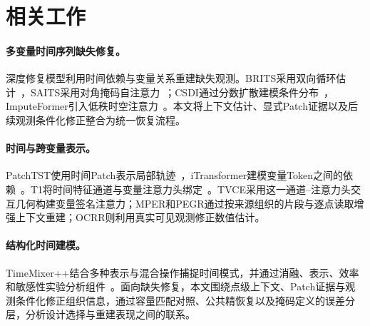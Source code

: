 \section{相关工作}\label{sec:related}
\paragraph{多变量时间序列缺失修复。}
深度修复模型利用时间依赖与变量关系重建缺失观测。BRITS采用双向循环估计~\cite{brits}，SAITS采用对角掩码自注意力~\cite{saits}；CSDI通过分数扩散建模条件分布~\cite{csdi}，ImputeFormer引入低秩时空注意力~\cite{imputeformer}。本文将上下文估计、显式Patch证据以及后续观测条件化修正整合为统一恢复流程。

\paragraph{时间与跨变量表示。}
PatchTST使用时间Patch表示局部轨迹~\cite{patchtst}，iTransformer建模变量Token之间的依赖~\cite{itransformer}。T1将时间特征通道与变量注意力头绑定~\cite{t1}。TVCE采用这一通道--注意力头交互几何构建变量签名注意力；MPER和PEGR通过按来源组织的片段与逐点读取增强上下文重建；OCRR则利用真实可见观测修正数值估计。

\paragraph{结构化时间建模。}
TimeMixer++结合多种表示与混合操作捕捉时间模式，并通过消融、表示、效率和敏感性实验分析组件~\cite{timemixerpp}。面向缺失修复，本文围绕点级上下文、Patch证据与观测条件化修正组织信息，通过容量匹配对照、公共精恢复以及掩码定义的误差分层，分析设计选择与重建表现之间的联系。
